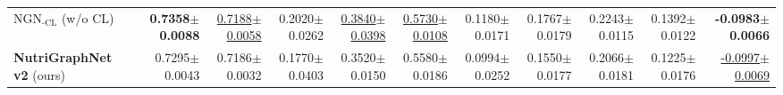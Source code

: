\begin{table}[t]
{\begin{tabular}{lrrrrrrrrrr}
NGN$_{\text{-CL}}$ (w/o CL) & \textbf{0.7358\tiny{$\pm$0.0088}} & \underline{0.7188\tiny{$\pm$0.0058}} & 0.2020\tiny{$\pm$0.0262} & \underline{0.3840\tiny{$\pm$0.0398}} & \underline{0.5730\tiny{$\pm$0.0108}} & 0.1180\tiny{$\pm$0.0171} & 0.1767\tiny{$\pm$0.0179} & 0.2243\tiny{$\pm$0.0115} & 0.1392\tiny{$\pm$0.0122} & \textbf{-0.0983\tiny{$\pm$0.0066}} \\
\textbf{NutriGraphNet v2} (ours) & 0.7295\tiny{$\pm$0.0043} & 0.7186\tiny{$\pm$0.0032} & 0.1770\tiny{$\pm$0.0403} & 0.3520\tiny{$\pm$0.0150} & 0.5580\tiny{$\pm$0.0186} & 0.0994\tiny{$\pm$0.0252} & 0.1550\tiny{$\pm$0.0177} & 0.2066\tiny{$\pm$0.0181} & 0.1225\tiny{$\pm$0.0176} & \underline{-0.0997\tiny{$\pm$0.0069}} \\
\bottomrule
\end{tabular}}
\end{table}
